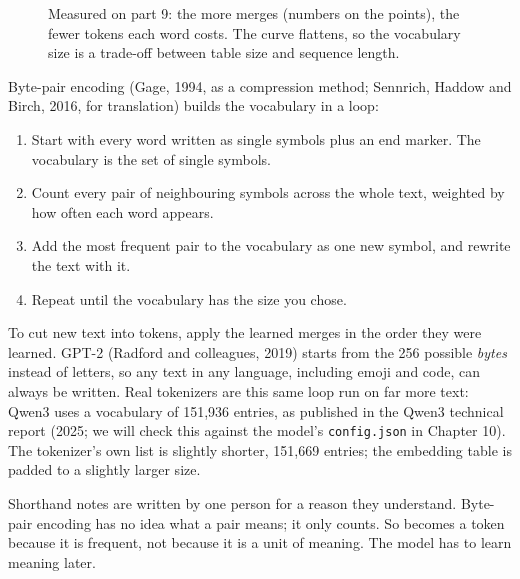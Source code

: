\begin{figure}[h]
\centering
{}
\caption{Measured on part 9: the more merges (numbers on the points), the fewer tokens each word costs.
The curve flattens, so the vocabulary size is a trade-off between table size and sequence length.}
\end{figure}

\Exactly Byte-pair encoding (Gage, 1994, as a compression method; Sennrich, Haddow and Birch, 2016, for
translation) builds the vocabulary in a loop:
\begin{enumerate}[label=\arabic*.]
\item Start with every word written as single symbols plus an end marker. The vocabulary is the set of
single symbols.
\item Count every pair of neighbouring symbols across the whole text, weighted by how often each word appears.
\item Add the most frequent pair to the vocabulary as one new symbol, and rewrite the text with it.
\item Repeat until the vocabulary has the size you chose.
\end{enumerate}
To cut new text into tokens, apply the learned merges in the order they were learned. GPT-2 (Radford
and colleagues, 2019) starts from the 256 possible \emph{bytes} instead of letters, so any text in any
language, including emoji and code, can always be written. Real tokenizers are this same loop run on far
more text: Qwen3 uses a vocabulary of 151{,}936 entries, as published in the Qwen3 technical report (2025;
we will check this against the model's \texttt{config.json} in Chapter 10). The tokenizer's own list
is slightly shorter, 151{,}669 entries; the embedding table is padded to a slightly larger size.

\begin{breaks}
Shorthand notes are written by one person for a reason they understand. Byte-pair encoding has no idea
what a pair means; it only counts. So  becomes a token because it is frequent, not because it is a
unit of meaning. The model has to learn meaning later.
\end{breaks}


